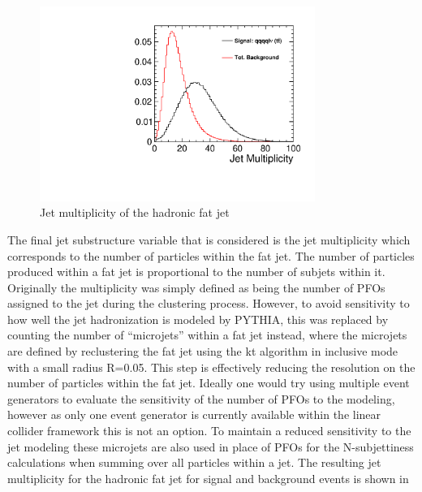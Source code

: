 \begin{figure}
  \centering
  \includegraphics[width=0.8\textwidth]{TopAnalysis/figures/JetMultiplicity.pdf}
  \caption[Jet multiplicity of the hadronic fat jet]{Jet multiplicity of the hadronic fat jet}
  \label{fig:multiplicity}
\end{figure}


The final jet substructure variable that is considered is the jet multiplicity which corresponds to the number of particles within the fat jet. The number of particles produced within a fat jet is proportional to the number of subjets within it. Originally the multiplicity was simply defined as being the number of \ac{PFO}s assigned to the jet during the clustering process. However, to avoid sensitivity to how well the jet hadronization is modeled by PYTHIA, this was replaced by counting the number of ``microjets'' within a fat jet instead, where the microjets are defined by reclustering the fat jet using the kt algorithm in inclusive mode with a small radius R=0.05. This step is effectively reducing the resolution on the number of particles within the fat jet. Ideally one would try using multiple event generators to evaluate the sensitivity of the number of PFOs to the modeling, however as only one event generator is currently available within the linear collider framework this is not an option. To maintain a reduced sensitivity to the jet modeling these microjets are also used in place of PFOs for the N-subjettiness calculations when summing over all particles within a jet. The resulting jet multiplicity for the hadronic fat jet for signal and background events is shown in 

